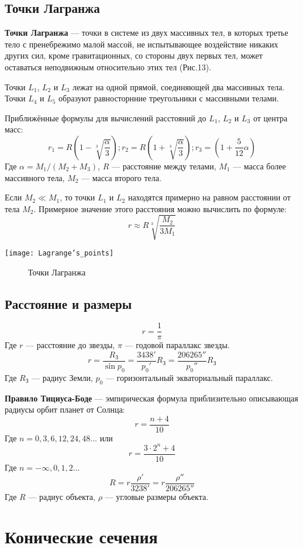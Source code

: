 \documentclass[10pt,a5paper]{article}
\begin{document}
\subsection{Точки Лагранжа}

\textbf{Точки Лагранжа} --- точки в системе из двух массивных тел, в которых третье тело с пренебрежимо малой массой, не испытывающее воздействие никаких других сил, кроме гравитационных, со стороны двух первых тел, может оставаться неподвижным относительно этих тел (Рис.13).

Точки $L_1$, $L_2$ и $L_3$ лежат на одной прямой, соединяющей два массивных тела. Точки $L_4$ и $L_5$ образуют равносторнние треугольники с массивными телами.

Приближённые формулы для вычислений расстояний до $L_1$, $L_2$ и $L_3$ от центра масс:
$$r_1=R\left(1-\sqrt[3]{\frac{\alpha}{3}}\right); r_2=R\left(1+\sqrt[3]{\frac{\alpha}{3}}\right); r_3=\left(1+\frac{5}{12}\alpha\right)$$
Где $\alpha=M_1/(M_2+M_3)$, $R$ --- расстояние между телами, $M_1$ --- масса более массивного тела, $M_2$ --- масса второго тела.

Если $M_2\ll M_1$, то точки $L_1$ и $L_2$ находятся примерно на равном расстоянии от тела $M_2$. Примерное значение этого расстояния можно вычислить по формуле:
$$r\approx R\sqrt[3]{\frac{M_2}{3M_1}}$$
\begin{center}
\texttt{[image: Lagrange's\_points]}
\begin{figure}[h!]
\caption{Точки Лагранжа}
\end{figure}
\end{center}
\subsection{Расстояние и размеры}
$$r=\frac{1}{\pi}$$
Где $r$ --- расстояние до звезды, $\pi$ --- годовой параллакс звезды.
$$r=\frac{R_{\text{З}}}{\sin p_0}=\frac{3438'}{p_0'}R_{\text{З}}=\frac{206265''}{p_0''}R_{\text{З}}$$
Где $R_{\text{З}}$ --- радиус Земли, $p_0$ --- горизонтальный экваториальный параллакс.

\textbf{Правило Тициуса-Боде} --- эмпирическая формула приблизительно описывающая радиусы орбит планет от Солнца:
$$r=\frac{n+4}{10}$$
Где $n=0, 3 ,6, 12, 24, 48...$ или
$$r=\frac{3\cdot 2^n+4}{10}$$
Где $n=-\infty, 0, 1, 2...$
$$R=r\frac{\rho'}{3238'}=r\frac{\rho''}{206265''}$$
Где $R$ --- радиус объекта, $\rho$ --- угловые размеры объекта.
\section{Конические сечения}
\end{document}
